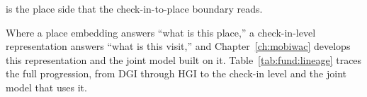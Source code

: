is the place side that the check-in-to-place boundary reads.

%

Where a place embedding answers ``what is this place,'' a check-in-level representation
answers ``what is this visit,'' and
Chapter~\ref{ch:mobiwac} develops this representation and the joint model built on it.
Table~\ref{tab:fund:lineage} traces the full progression, from DGI through HGI to the
check-in level and the joint model that uses it.

